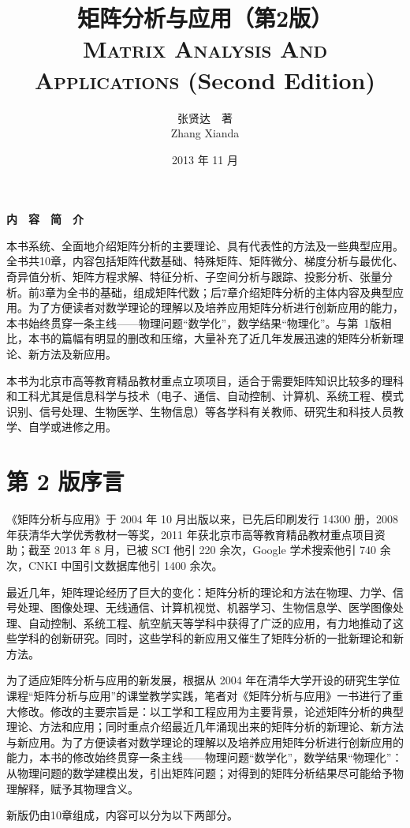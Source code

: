 \documentclass[punct=kaiming, fontset=fandol]{ctexbook}
\title{矩阵分析与应用（第2版）\\\textsc{Matrix Analysis And Applications} (Second Edition)}
\author{张贤达　著\\Zhang Xianda}
\date{2013 年 11 月}
\makeatletter
\numberwithin{equation}{section}
\theoremstyle{mystyle}
\newenvironment{abstract}{%
  \small%
  \begin{center}%
    {\bfseries 内　容　简　介}\vspace{-.5em}\vspace{\z@}%
  \end{center}\par}{\par}
\makeatother
\begin{document}
  \frontmatter
  \maketitle
  \begin{abstract}
    本书系统、全面地介绍矩阵分析的主要理论、具有代表性的方法及一些典型应用。全书共10章，内容包括矩阵代数基础、特殊矩阵、矩阵微分、梯度分析与最优化、奇异值分析、矩阵方程求解、特征分析、子空间分析与跟踪、投影分析、张量分析。前3章为全书的基础，组成矩阵代数；后7章介绍矩阵分析的主体内容及典型应用。为了方便读者对数学理论的理解以及培养应用矩阵分析进行创新应用的能力，本书始终贯穿一条主线——物理问题“数学化”，数学结果“物理化”。与第~1版相比，本书的篇幅有明显的删改和压缩，大量补充了近几年发展迅速的矩阵分析新理论、新方法及新应用。

    本书为北京市高等教育精品教材重点立项项目，适合于需要矩阵知识比较多的理科和工科尤其是信息科学与技术（电子、通信、自动控制、计算机、系统工程、模式识别、信号处理、生物医学、生物信息）等各学科有关教师、研究生和科技人员教学、自学或进修之用。
  \end{abstract}

  \chapter{第 2 版序言}
  《矩阵分析与应用》于 2004 年 10 月出版以来，已先后印刷发行 14300 册，2008 年获清华大学优秀教材一等奖，2011 年获北京市高等教育精品教材重点项目资助；截至 2013 年 8 月，已被 SCI 他引 220 余次，Google 学术搜索他引 740 余次，CNKI 中国引文数据库他引 1400 余次。

  最近几年，矩阵理论经历了巨大的变化：矩阵分析的理论和方法在物理、力学、信号处理、图像处理、无线通信、计算机视觉、机器学习、生物信息学、医学图像处理、自动控制、系统工程、航空航天等学科中获得了广泛的应用，有力地推动了这些学科的创新研究。同时，这些学科的新应用又催生了矩阵分析的一批新理论和新方法。

  为了适应矩阵分析与应用的新发展，根据从 2004 年在清华大学开设的研究生学位课程“矩阵分析与应用”的课堂教学实践，笔者对《矩阵分析与应用》一书进行了重大修改。修改的主要宗旨是：以工学和工程应用为主要背景，论述矩阵分析的典型理论、方法和应用；同时重点介绍最近几年涌现出来的矩阵分析的新理论、新方法与新应用。为了方便读者对数学理论的理解以及培养应用矩阵分析进行创新应用的能力，本书的修改始终贯穿一条主线——物理问题“数学化”，数学结果“物理化”：从物理问题的数学建模出发，引出矩阵问题；对得到的矩阵分析结果尽可能给予物理解释，赋予其物理含义。

  新版仍由10章组成，内容可以分为以下两部分。
\end{document}
